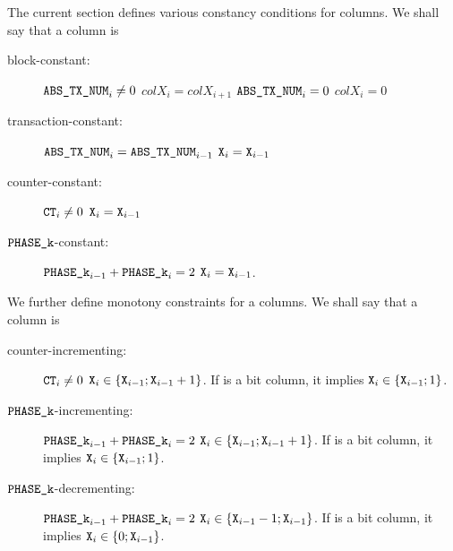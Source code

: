 The current section defines various constancy conditions for columns.
We shall say that a column  is
\begin{description}
	\item[block-constant:]
		\If $\texttt{ABS\_TX\_NUM}_{i} \neq 0$ \Then $col{X}_{i} = col{X}_{i + 1}$ \et \If $\texttt{ABS\_TX\_NUM}_{i} = 0$ \Then $col{X}_{i} = 0$
	\item[transaction-constant:]
		\If $\texttt{ABS\_TX\_NUM}_{i} = \texttt{ABS\_TX\_NUM}_{i-1}$ \Then $\texttt{X}_{i} = \texttt{X}_{i-1}$
	\item[counter-constant:]
		\If $\texttt{CT}_{i} \neq 0$ \Then $\texttt{X}_{i} = \texttt{X}_{i-1}$
	\item[$\texttt{PHASE\_k}$-constant:]
		\If $\texttt{PHASE\_k}_{i-1} + \texttt{PHASE\_k}_{i} = 2$ \Then $\texttt{X}_{i} = \texttt{X}_{i-1}$.
\end{description}
We further define monotony constraints for a columns.
We shall say that a column  is
\begin{description}
	\item[counter-incrementing:]
		\If $\texttt{CT}_{i} \neq 0$ \Then $\texttt{X}_{i} \in \{\texttt{X}_{i-1}; \texttt{X}_{i-1} + 1 \}$. If  is a bit column, it implies $\texttt{X}_{i} \in \{\texttt{X}_{i-1}; 1 \}$.
	\item[$\texttt{PHASE\_k}$-incrementing:]
		\If $\texttt{PHASE\_k}_{i-1} + \texttt{PHASE\_k}_{i} = 2$ \Then $\texttt{X}_{i} \in \{\texttt{X}_{i-1}; \texttt{X}_{i-1} + 1 \}$. If  is a bit column, it implies $\texttt{X}_{i} \in \{\texttt{X}_{i-1}; 1 \}$.
	\item[$\texttt{PHASE\_k}$-decrementing:]
		\If $\texttt{PHASE\_k}_{i-1} + \texttt{PHASE\_k}_{i} = 2$ \Then $\texttt{X}_{i} \in \{\texttt{X}_{i-1} -1; \texttt{X}_{i-1} \}$. If  is a bit column, it implies $\texttt{X}_{i} \in \{0 ; \texttt{X}_{i-1}\}$.
\end{description}

